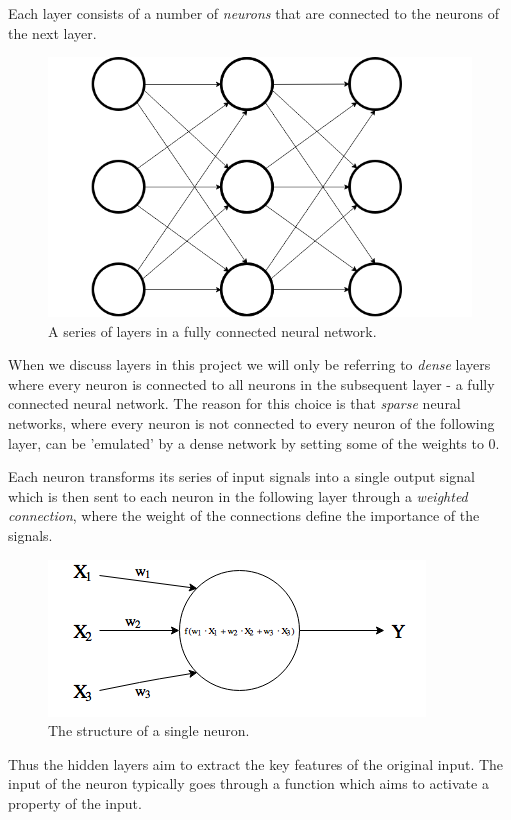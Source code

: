 \documentclass[11pt]{article}
\begin{document}
Each layer consists of a number of \textit{neurons} that are connected to the neurons of the
next layer.
\begin{figure}[!h]
    \centering
    \includegraphics{include/layers.png}
    \caption{A series of layers in a fully connected neural network.}
    \label{fig:layers}
\end{figure}
When we discuss layers in this project we will only be referring to \textit{dense}
layers where every neuron is connected to all neurons in the subsequent layer - a fully
connected neural network.
The reason for this choice is that \textit{sparse} neural networks, where every neuron is not
connected to every neuron of the following layer, can be 'emulated' by a dense network by setting some of the
weights to 0.

Each neuron transforms its series of input signals into a single output signal which is then sent to
each neuron in the following layer through a \textit{weighted connection}, where
the weight of the connections define the importance of the signals.
\begin{figure}[!h]
    \centering
    \includegraphics{include/neuron.png}
    \caption{The structure of a single neuron.}
    \label{fig:neuron}
\end{figure}
Thus the hidden layers aim to extract the key features of the original input.
The input of the neuron typically goes through a function which aims to activate
a property of the input.
\end{document}

